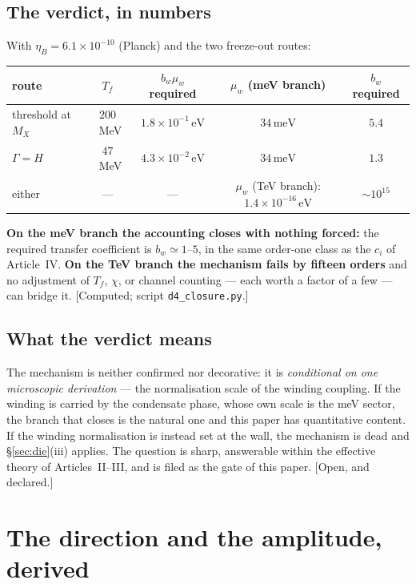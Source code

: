 \documentclass[11pt,a4paper]{article}
\newcommand{\meV}{\,\mathrm{meV}}
\newcommand{\eV}{\,\mathrm{eV}}
\begin{document}
\subsection{The verdict, in numbers}
With $\eta_B=6.1\times10^{-10}$ (Planck) and the two freeze-out routes:
\begin{center}\small
\begin{tabular}{lcccc}
\toprule
route & $T_f$ & $b_w\mu_w$ required & $\mu_w$ (meV branch) & $b_w$ required\\
\midrule
threshold at $M_X$ & $200$~MeV & $1.8\times10^{-1}\eV$ & $34\meV$ & $\mathbf{5.4}$\\
$\Gamma=H$ & $47$~MeV & $4.3\times10^{-2}\eV$ & $34\meV$ & $\mathbf{1.3}$\\
\midrule
either & --- & --- & $\mu_w$ (TeV branch): $1.4\times10^{-16}\eV$ &
$\sim10^{15}$\\
\bottomrule
\end{tabular}
\end{center}
\textbf{On the meV branch the accounting closes with nothing forced:} the
required transfer coefficient is $b_w\simeq1$--$5$, in the same order-one class
as the $c_i$ of Article~IV. \textbf{On the TeV branch the mechanism fails by
fifteen orders} and no adjustment of $T_f$, $\chi$, or channel counting ---
each worth a factor of a few --- can bridge it. [Computed; script
\texttt{d4\_closure.py}.]

\subsection{What the verdict means}
The mechanism is neither confirmed nor decorative: it is \emph{conditional on
one microscopic derivation} --- the normalisation scale of the winding
coupling. If the winding is carried by the condensate phase, whose own scale is
the meV sector, the branch that closes is the natural one and this paper has
quantitative content. If the winding normalisation is instead set at the wall,
the mechanism is dead and \S\ref{sec:die}(iii) applies. The question is sharp,
answerable within the effective theory of Articles~II--III, and is filed as
the gate of this paper. [Open, and declared.]

\section{The direction and the amplitude, derived}
\label{sec:dipole}
\end{document}
